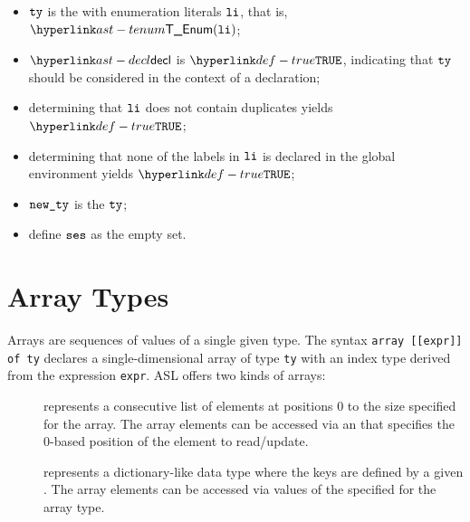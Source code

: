 \ProseParagraph
\AllApply
\begin{itemize}
  \item $\tty$ is the \enumerationtypeterm{} with enumeration literals
        $\vli$, that is, $\TEnum(\vli)$;
  \item $\decl$ is $\True$, indicating that $\tty$ should be considered in the context of a declaration;
  \item determining that $\vli$ does not contain duplicates yields $\True$\ProseOrTypeError;
  \item determining that none of the labels in $\vli$ is declared in the global environment
  yields $\True$\ProseOrTypeError;
  \item $\newty$ is the \enumerationtypeterm{} $\tty$;
  \item define $\vses$ as the empty set.
\end{itemize}

\FormallyParagraph
\begin{mathpar}
\end{mathpar}

\section{Array Types\label{sec:ArrayTypes}}
\hypertarget{arraytypeterm}{}
%
Arrays are sequences of values of a single given type.
The syntax \verb|array [[expr]] of ty| declares a single-dimensional array of type \texttt{ty}
with an index type derived from the expression \texttt{expr}.
%
%
ASL offers two kinds of arrays:
\hypertarget{intarraytypeterm}{}
\hypertarget{enumarraytypeterm}{}
\begin{description}
  \item[\Intarraytypeterm] represents a consecutive list of elements at positions $0$ to the size
      specified for the array. The array elements can be accessed via an \integertypeterm{}
      that specifies the $0$-based position of the element to read/update.
  \item[\Enumarraytypeterm] represents a dictionary-like data type where the keys are defined
      by a given \enumerationtypeterm{}. The array elements can be accessed via values of the
      \enumerationtypeterm{} specified for the array type.
\end{description}

